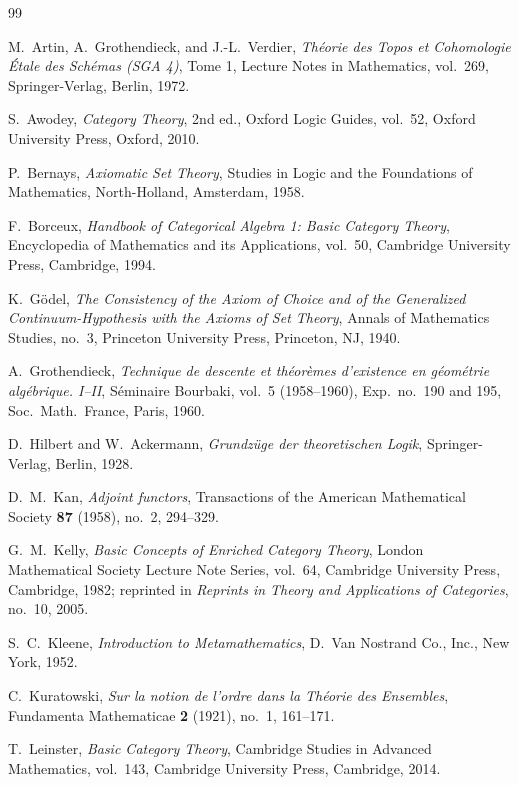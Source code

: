 \documentclass[10pt,a4paper]{article}
\begin{document}
\begin{thebibliography}{99}

M.~Artin, A.~Grothendieck, and J.-L.~Verdier,
\emph{Th\'eorie des Topos et Cohomologie \'Etale des Sch\'emas (SGA 4)}, Tome 1,
Lecture Notes in Mathematics, vol.~269, Springer-Verlag, Berlin, 1972.

S.~Awodey,
\emph{Category Theory}, 2nd ed.,
Oxford Logic Guides, vol.~52, Oxford University Press, Oxford, 2010.

P.~Bernays,
\emph{Axiomatic Set Theory},
Studies in Logic and the Foundations of Mathematics, North-Holland, Amsterdam, 1958.

F.~Borceux,
\emph{Handbook of Categorical Algebra 1: Basic Category Theory},
Encyclopedia of Mathematics and its Applications, vol.~50, Cambridge University Press, Cambridge, 1994.

K.~G\"odel,
\emph{The Consistency of the Axiom of Choice and of the Generalized Continuum-Hypothesis with the Axioms of Set Theory},
Annals of Mathematics Studies, no.~3, Princeton University Press, Princeton, NJ, 1940.

A.~Grothendieck,
\emph{Technique de descente et th\'eor\`emes d'existence en g\'eom\'etrie alg\'ebrique. I--II},
S\'eminaire Bourbaki, vol.~5 (1958--1960), Exp.\ no.~190 and 195, Soc.\ Math.\ France, Paris, 1960.

D.~Hilbert and W.~Ackermann,
\emph{Grundz\"uge der theoretischen Logik},
Springer-Verlag, Berlin, 1928.

D.~M.~Kan,
\emph{Adjoint functors},
Transactions of the American Mathematical Society \textbf{87} (1958), no.~2, 294--329.

G.~M.~Kelly,
\emph{Basic Concepts of Enriched Category Theory},
London Mathematical Society Lecture Note Series, vol.~64, Cambridge University Press, Cambridge, 1982; reprinted in \emph{Reprints in Theory and Applications of Categories}, no.~10, 2005.

S.~C.~Kleene,
\emph{Introduction to Metamathematics},
D.~Van Nostrand Co., Inc., New York, 1952.

C.~Kuratowski,
\emph{Sur la notion de l'ordre dans la Th\'eorie des Ensembles},
Fundamenta Mathematicae \textbf{2} (1921), no.~1, 161--171.

T.~Leinster,
\emph{Basic Category Theory},
Cambridge Studies in Advanced Mathematics, vol.~143, Cambridge University Press, Cambridge, 2014.


\end{thebibliography}
\end{document}
